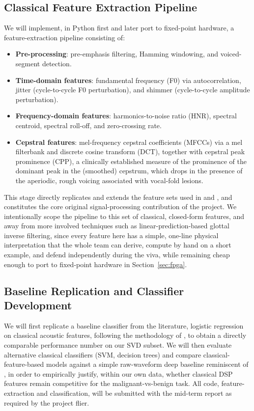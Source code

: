 \documentclass[conference]{IEEEtran}
\begin{document}
\subsection{Classical Feature Extraction Pipeline}
We will implement, in Python first and later port to fixed-point hardware, a feature-extraction pipeline consisting of:
\begin{itemize}
    \item \textbf{Pre-processing}: pre-emphasis filtering, Hamming windowing, and voiced-segment detection.
    \item \textbf{Time-domain features}: fundamental frequency (F0) via autocorrelation, jitter (cycle-to-cycle F0 perturbation), and shimmer (cycle-to-cycle amplitude perturbation).
    \item \textbf{Frequency-domain features}: harmonics-to-noise ratio (HNR), spectral centroid, spectral roll-off, and zero-crossing rate.
    \item \textbf{Cepstral features}: mel-frequency cepstral coefficients (MFCCs) via a mel filterbank and discrete cosine transform (DCT), together with cepstral peak prominence (CPP), a clinically established measure of the prominence of the dominant peak in the (smoothed) cepstrum, which drops in the presence of the aperiodic, rough voicing associated with vocal-fold lesions.
\end{itemize}
This stage directly replicates and extends the feature sets used in \cite{lee2021} and \cite{paterson2024}, and constitutes the core original signal-processing contribution of the project. We intentionally scope the pipeline to this set of classical, closed-form features, and away from more involved techniques such as linear-prediction-based glottal inverse filtering, since every feature here has a simple, one-line physical interpretation that the whole team can derive, compute by hand on a short example, and defend independently during the viva, while remaining cheap enough to port to fixed-point hardware in Section~\ref{sec:fpga}.

\subsection{Baseline Replication and Classifier Development}
We will first replicate a baseline classifier from the literature, logistic regression on classical acoustic features, following the methodology of \cite{paterson2024}, to obtain a directly comparable performance number on our SVD subset. We will then evaluate alternative classical classifiers (SVM, decision trees) and compare classical-feature-based models against a simple raw-waveform deep baseline reminiscent of \cite{harar2017}, in order to empirically justify, within our own data, whether classical DSP features remain competitive for the malignant-vs-benign task. All code, feature-extraction and classification, will be submitted with the mid-term report as required by the project flier.
\end{document}
